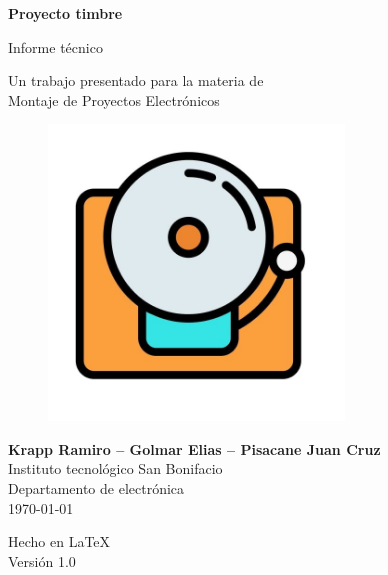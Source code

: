 \documentclass{article}
\begin{document}
\begin{titlepage}
	\begin{center}
		\vspace{1cm}

		{\Huge
		\textbf{Proyecto timbre}}

		\vspace{0.3cm}
		{\LARGE
		Informe técnico}	

		\vspace{0.5cm}
		{\Large
		Un trabajo presentado para la materia de \\
		Montaje de Proyectos Electrónicos}
				
		\vspace{2cm}
		
		\begin{figure}[H]
			\centering
			\includegraphics[width=0.7\textwidth]{timbre.jpg}
		\end{figure}
		
		\vfill
		
		{\Large
			\textbf{Krapp Ramiro -- Golmar Elias -- Pisacane Juan Cruz} \\
			\vspace{0.5cm}
			Instituto tecnológico San Bonifacio\\
			Departamento de electrónica\\
			\today
		}
	  
		\vspace{0.5cm}
		{\large Hecho en {\LaTeX}\\
		Versión 1.0}
			
	\end{center}
\end{titlepage}
\end{document}
